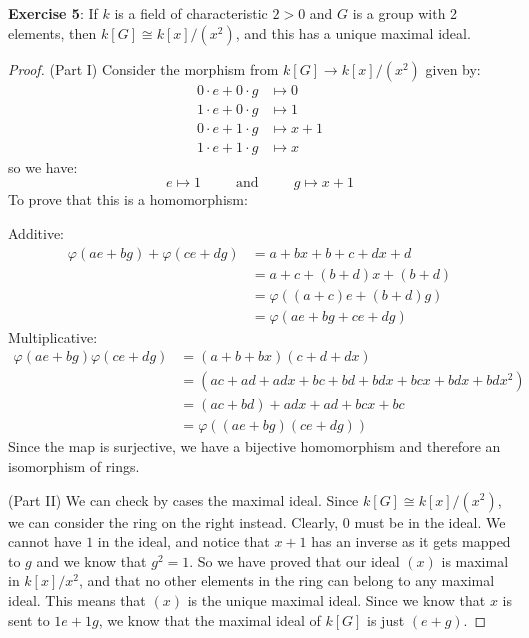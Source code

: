 \documentclass{article}
\begin{document}
\textbf{Exercise 5}: If $k$ is a field of characteristic $2 > 0$ and $G$ is a group with 2 elements, then $k[G] \cong k[x]/(x^{2})$, and this has a unique maximal ideal.
    \begin{proof}
        (Part I) Consider the morphism from $k[G] \rightarrow k[x]/(x^{2})$ given by:
            \begin{align*}
                0 \cdot e + 0 \cdot g &\mapsto  0     \\
                1 \cdot e + 0 \cdot g &\mapsto  1     \\
                0 \cdot e + 1 \cdot g &\mapsto  x + 1 \\
                1 \cdot e + 1 \cdot g &\mapsto  x       
            \end{align*}
        so we have:
            \begin{equation*}
                e \mapsto 1 \hspace{30pt} \text{and} \hspace{30pt} g \mapsto x + 1
            \end{equation*}
        To prove that this is a homomorphism:

        Additive:
            \begin{align*}
                \varphi(ae + bg) + \varphi(ce + dg) &= a + bx + b + c + dx + d      \\
                                                    &= a + c + (b + d)x + (b + d)   \\
                                                    &= \varphi((a + c)e + (b + d)g) \\
                                                    &= \varphi(ae + bg + ce + dg)     
            \end{align*}
        Multiplicative:
            \begin{align*}
                \varphi(ae + bg)\varphi(ce + dg) &= (a + b + bx)(c + d + dx)                              \\
                                                 &= (ac + ad + adx + bc + bd + bdx + bcx + bdx + bdx^{2}) \\
                                                 &= (ac + bd) + adx + ad + bcx + bc                       \\
                                                 &= \varphi((ae + bg)(ce + dg)) 
            \end{align*}
        Since the map is surjective, we have a bijective homomorphism and therefore an isomorphism of rings.

        (Part II) We can check by cases the maximal ideal. Since $k[G] \cong k[x]/(x^{2})$, we can consider the ring on the right instead. Clearly, $0$ must be in the ideal. We cannot have $1$ in the ideal, and notice that $x + 1$ has an inverse as it gets mapped to $g$ and we know that $g^{2} = 1$. So we have proved that our ideal $(x)$ is maximal in $k[x]/x^{2}$, and that no other elements in the ring can belong to any maximal ideal. This means that $(x)$ is the unique maximal ideal. Since we know that $x$ is sent to $1e + 1g$, we know that the maximal ideal of $k[G]$ is just $(e + g)$.
    \end{proof}
\end{document}
